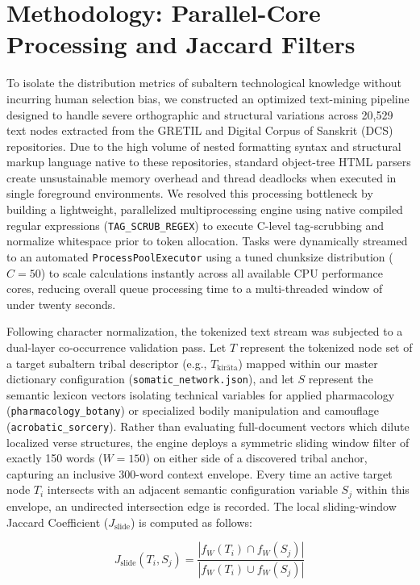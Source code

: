 \documentclass[11pt,twoside,letterpaper]{article}
\begin{document}
\section{Methodology: Parallel-Core Processing and Jaccard Filters}
To isolate the distribution metrics of subaltern technological knowledge without incurring human selection bias, we constructed an optimized text-mining pipeline designed to handle severe orthographic and structural variations across 20,529 text nodes extracted from the GRETIL and Digital Corpus of Sanskrit (DCS) repositories. Due to the high volume of nested formatting syntax and structural markup language native to these repositories, standard object-tree HTML parsers create unsustainable memory overhead and thread deadlocks when executed in single foreground environments. We resolved this processing bottleneck by building a lightweight, parallelized multiprocessing engine using native compiled regular expressions (\texttt{TAG\_SCRUB\_REGEX}) to execute C-level tag-scrubbing and normalize whitespace prior to token allocation. Tasks were dynamically streamed to an automated \texttt{ProcessPoolExecutor} using a tuned chunksize distribution ($C = 50$) to scale calculations instantly across all available CPU performance cores, reducing overall queue processing time to a multi-threaded window of under twenty seconds.

Following character normalization, the tokenized text stream was subjected to a dual-layer co-occurrence validation pass. Let $T$ represent the tokenized node set of a target subaltern tribal descriptor (e.g., $T_{\text{kir\={a}ta}}$) mapped within our master dictionary configuration (\texttt{somatic\_network.json}), and let $S$ represent the semantic lexicon vectors isolating technical variables for applied pharmacology (\texttt{pharmacology\_botany}) or specialized bodily manipulation and camouflage (\texttt{acrobatic\_sorcery}). Rather than evaluating full-document vectors which dilute localized verse structures, the engine deploys a symmetric sliding window filter of exactly 150 words ($W = 150$) on either side of a discovered tribal anchor, capturing an inclusive 300-word context envelope. Every time an active target node $T_i$ intersects with an adjacent semantic configuration variable $S_j$ within this envelope, an undirected intersection edge is recorded. The local sliding-window Jaccard Coefficient ($J_{\text{slide}}$) is computed as follows:

\begin{equation}
J_{\text{slide}}(T_i, S_j) = \frac{|f_W(T_i) \cap f_W(S_j)|}{|f_W(T_i) \cup f_W(S_j)|}
\end{equation}
\end{document}
